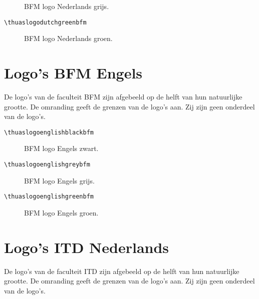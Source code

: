 \documentclass[a4paper,12pt]{article}
\begin{document}
\begin{figure}[H]
\centering\fboxsep=0pt%
\fbox{%
\scalebox{0.7071}{\thuaslogodutchgreybfm}}
\caption{BFM logo Nederlands grijs.}
\end{figure}

\begin{verbatim}
\thuaslogodutchgreenbfm
\end{verbatim}

\begin{figure}[H]
\centering\fboxsep=0pt%
\fbox{%
\scalebox{0.7071}{\thuaslogodutchgreenbfm}}
\caption{BFM logo Nederlands groen.}
\end{figure}


\section{Logo's BFM Engels}
De logo's van de faculteit BFM zijn afgebeeld op de helft van hun natuurlijke grootte.
De omranding geeft de grenzen van de logo's aan. Zij zijn geen onderdeel
van de logo's.

\begin{verbatim}
\thuaslogoenglishblackbfm
\end{verbatim}

\begin{figure}[H]
\centering\fboxsep=0pt%
\fbox{%
\scalebox{0.7071}{\thuaslogoenglishblackbfm}}
\caption{BFM logo Engels zwart.}
\end{figure}

\begin{verbatim}
\thuaslogoenglishgreybfm
\end{verbatim}

\begin{figure}[H]
\centering\fboxsep=0pt%
\fbox{%
\scalebox{0.7071}{\thuaslogoenglishgreybfm}}
\caption{BFM logo Engels grijs.}
\end{figure}

\begin{verbatim}
\thuaslogoenglishgreenbfm
\end{verbatim}

\begin{figure}[H]
\centering\fboxsep=0pt%
\fbox{%
\scalebox{0.7071}{\thuaslogoenglishgreenbfm}}
\caption{BFM logo Engels groen.}
\end{figure}


\section{Logo's ITD Nederlands}
De logo's van de faculteit ITD zijn afgebeeld op de helft van hun natuurlijke grootte.
De omranding geeft de grenzen van de logo's aan. Zij zijn geen onderdeel
van de logo's.
\end{document}
